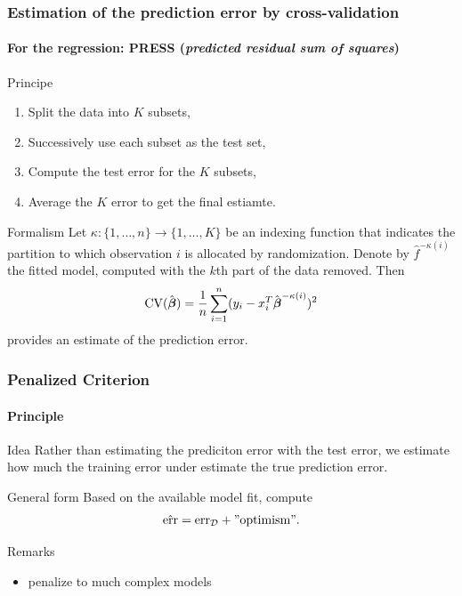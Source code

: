 \documentclass[10pt, c, xcolor=x11names]{beamer}\usepackage[]{graphicx}\usepackage[]{color}
\begin{document}
\begin{frame}
  \frametitle{Estimation of the prediction error by cross-validation}
  \framesubtitle{For the regression: PRESS (\textit{predicted residual sum of squares})}

  \begin{block}{Principe}
    \vspace{-.25cm}
    \begin{enumerate}
    \item Split the data into $K$ subsets,
    \item Successively use each subset as the test set,
    \item Compute the test error for the $K$ subsets,
    \item Average the $K$ error to get the final estiamte.
    \end{enumerate}
  \end{block}

  \vspace{-.25cm}
  
  \begin{block}{Formalism}
    Let  $\kappa  :  \{1,\dots,n\} \rightarrow  \{1,\dots,K\}$  be  an
    indexing   function  that   indicates  the   partition  to   which
    observation  $i$   is  allocated   by  randomization.   Denote  by
    $\hat{f}^{-\kappa(i)}$ the  fitted model, computed with  the $k$th
    part of the data removed.  Then
   \begin{equation*}
     \mathrm{CV}(\hat{\boldsymbol\beta})     =    \frac{1}{n}\sum_{i=1}^n
     (y_i - x_i^T \hat{\boldsymbol\beta}^{-\kappa(i)} )^2
   \end{equation*}
   provides an estimate of the prediction error.
  \end{block}
  
\end{frame}

\begin{frame}
  \frametitle{Penalized Criterion}
  \framesubtitle{Principle}
  
  \begin{block}{Idea}
    Rather than estimating the prediciton error with the test error, we estimate how much the training error under estimate the true prediction error.
  \end{block}

  \vfill
  
  \begin{block}{General form}
   Based on the available model fit, compute
    \begin{equation*}
      \hat{\mathrm{err}} = \mathrm{err}_{\mathcal{D}} + \mathrm{"optimism"}.
    \end{equation*}
  \end{block}

  \vfill
  
  \begin{block}{Remarks}
    \begin{itemize}
    \item \og penalize \fg to much complex models
    \end{itemize}
  \end{block}

\end{frame}
\end{document}
